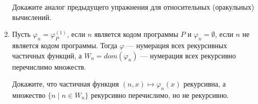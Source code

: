 \documentclass[a4paper,11pt]{article}
\begin{document}
\begin{enumerate}
Докажите аналог предыдущего упражнения для относительных (оракульных) вычислений.
\medskip

	\item Пусть $\varphi_n=\varphi^{(1)}_P$, если $n$ является кодом программы $P$ и $\varphi_n=\emptyset$, если $n$ не является кодом программы. Тогда $\varphi$ --- нумерация всех рекурсивных частичных функций, а $W_n=dom(\varphi_n)$ --- нумерация всех рекурсивно перечислимо множеств.

Докажите, что частичная функция $(n,x)\mapsto\varphi_n(x)$ рекурсивна, а множество $\{n\mid n\in W_n\}$ рекурсивно перечислимо, но не рекурсивно.




\end{enumerate}
\end{document}

